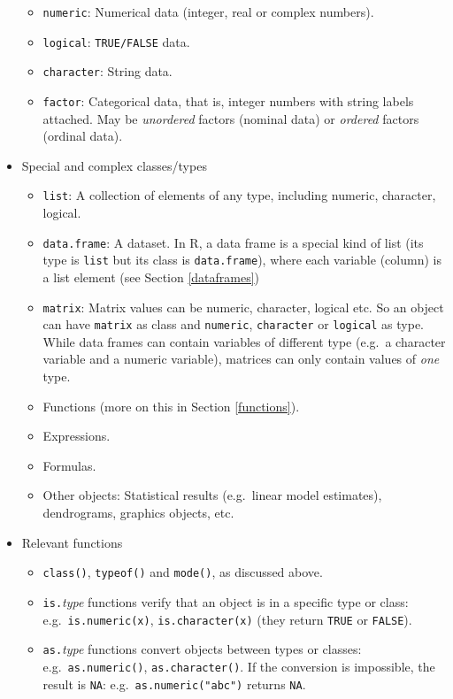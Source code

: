 \documentclass[
]{book}
\providecommand{\tightlist}{%
  \setlength{\itemsep}{0pt}\setlength{\parskip}{0pt}}
\begin{document}
\begin{itemize}
  \begin{itemize}
  \tightlist
  \item
    \texttt{numeric}: Numerical data (integer, real or complex numbers).
  \item
    \texttt{logical}: \texttt{TRUE/FALSE} data.
  \item
    \texttt{character}: String data.
  \item
    \texttt{factor}: Categorical data, that is, integer numbers with string labels attached. May be \emph{unordered} factors (nominal data) or \emph{ordered} factors (ordinal data).
  \end{itemize}
\item
  Special and complex classes/types

  \begin{itemize}
  \tightlist
  \item
    \texttt{list}: A collection of elements of any type, including numeric, character, logical.
  \item
    \texttt{data.frame}: A dataset. In R, a data frame is a special kind of list (its type is \texttt{list} but its class is \texttt{data.frame}), where each variable (column) is a list element (see Section \ref{dataframes})
  \item
    \texttt{matrix}: Matrix values can be numeric, character, logical etc. So an object can have \texttt{matrix} as class and \texttt{numeric}, \texttt{character} or \texttt{logical} as type. While data frames can contain variables of different type (e.g.~a character variable and a numeric variable), matrices can only contain values of \emph{one} type.
  \item
    Functions (more on this in Section \ref{functions}).
  \item
    Expressions.
  \item
    Formulas.
  \item
    Other objects: Statistical results (e.g.~linear model estimates), dendrograms, graphics objects, etc.
  \end{itemize}
\item
  Relevant functions

  \begin{itemize}
  \tightlist
  \item
    \texttt{class()}, \texttt{typeof()} and \texttt{mode()}, as discussed above.
  \item
    \texttt{is.}\emph{type} functions verify that an object is in a specific type or class: e.g.~\texttt{is.numeric(x)}, \texttt{is.character(x)} (they return \texttt{TRUE} or \texttt{FALSE}).
  \item
    \texttt{as.}\emph{type} functions convert objects between types or classes: e.g.~\texttt{as.numeric()}, \texttt{as.character()}. If the conversion is impossible, the result is \texttt{NA}: e.g.~\texttt{as.numeric("abc")} returns \texttt{NA}.
  \end{itemize}
\end{itemize}
\end{document}
